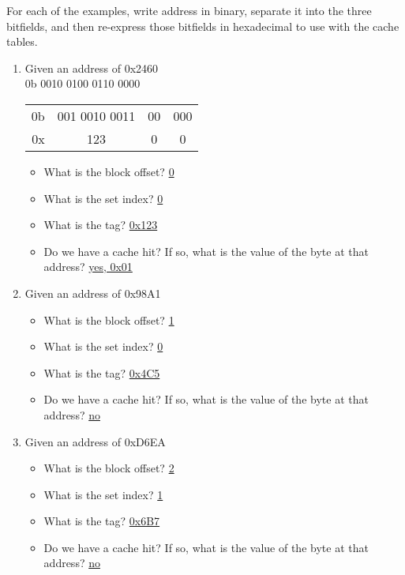 \documentclass{article}
\begin{document}
\phantom{x}

For each of the examples, write address in binary, separate it into the three
bitfields, and then re-express those bitfields in hexadecimal to use with the
cache tables.

\begin{enumerate}

\item Given an address of 0x2460 \\ 0b 0010 0100 0110 0000

    \begin{tabular}{rccc}
    0b & 001 0010 0011 & 00 & 000 \\ 0x & 123 & 0 & 0 \\
    \end{tabular}

    \begin{itemize}
    \item What is the block offset? \underline{0}
    \item What is the set index? \underline{0}
    \item What is the tag? \underline{0x123}
    \item Do we have a cache hit? If so, what is the value of the byte at that address? \underline{yes, 0x01}
    \end{itemize}

\item Given an address of 0x98A1
    \begin{itemize}
    \item What is the block offset? \underline{1}
    \item What is the set index? \underline{0}
    \item What is the tag? \underline{0x4C5}
    \item Do we have a cache hit? If so, what is the value of the byte at that address? \underline{no}
    \end{itemize}

\item Given an address of 0xD6EA
    \begin{itemize}
    \item What is the block offset? \underline{2}
    \item What is the set index? \underline{1}
    \item What is the tag? \underline{0x6B7}
    \item Do we have a cache hit? If so, what is the value of the byte at that address? \underline{no}
    \end{itemize}


\end{enumerate}
\end{document}
